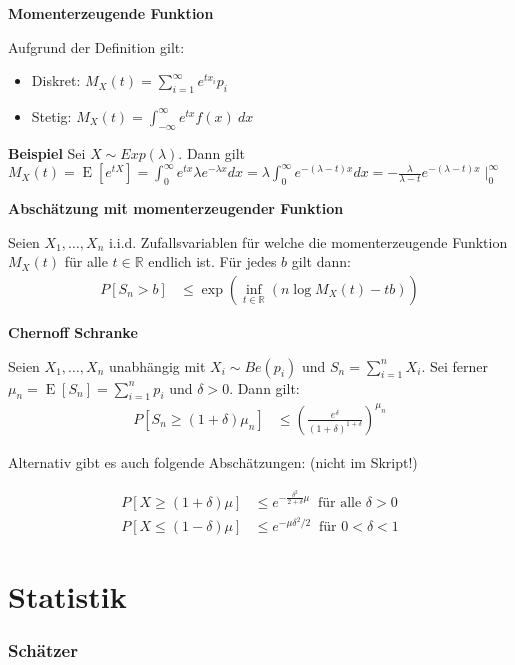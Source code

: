 \documentclass[25pt]{sciposter}
\newcommand{\R}{\mathbb{R}}
\newcommand{\E}{\operatorname{E}}
\newenvironment{method}[1]{\begin{mdframed}[backgroundcolor=blue!10,innertopmargin=15pt, innerbottommargin=15pt,nobreak=true]
		\textbf{#1 }
	}
	{ 
	\end{mdframed}
}
\begin{document}
\begin{multicols}{3}
\begin{method}{Momenterzeugende Funktion}
 Aufgrund der Definition gilt:\begin{itemize}
 	\item Diskret: $M_X(t) = \sum_{i=1}^{\infty} e^{tx_i}p_i$
 	\item Stetig: $M_X(t)= \int_{-\infty}^{\infty} e^{tx}f(x)\ dx$
 \end{itemize}
\end{method}

\textbf{Beispiel}
Sei $X \sim Exp(\lambda)$. Dann gilt $M_X(t) = \E[e^{tX}] = \int_{0}^{\infty} e^{tx} \lambda e^{-\lambda x} dx = \lambda \int_{0}^{\infty}e^{-(\lambda-t)x} dx = - \frac{\lambda}{\lambda - t} e^{-(\lambda -t)x}\mid_0^\infty$
\begin{method}{Abschätzung mit momenterzeugender Funktion}
Seien $X_1,\ldots,X_n$ i.i.d. Zufallsvariablen für welche die momenterzeugende Funktion $M_X(t)$ für alle $t\in \R$ endlich ist. Für jedes $b$ gilt dann:
\begin{align*}
	P[S_n > b] &\leq \exp \left( \inf_{t\in\R} \left(  n\log M_X(t) - tb \right)  \right)
\end{align*}
\end{method}


\begin{method}{Chernoff Schranke}
	Seien $X_1,\ldots,X_n$ unabhängig mit $X_i \sim Be(p_i)$ und $S_n = \sum_{i=1}^{n}X_i$. Sei ferner $\mu_n = \E[S_n] = \sum_{i=1}^{n} p_i$ und $\delta > 0$. Dann gilt:
	\begin{align*}
		P[S_n \geq (1+\delta)\mu_n] &\leq \left(\frac{e^\delta}{(1+\delta)^{1+\delta}}\right)^{\mu_n}
	\end{align*}
\end{method}

Alternativ gibt es auch folgende Abschätzungen: (nicht im Skript!)

\begin{align*}
	P[X \geq (1+\delta)\mu] &\leq e^{-\frac{\delta^2}{2+\delta}\mu} \ \text{ für alle } \delta > 0  \\
	P[X \leq (1-\delta)\mu] &\leq e^{-\mu\delta^2/2} \ \text{ für } 0 < \delta < 1
\end{align*}


\part{Statistik}

\section{Schätzer}

\end{multicols}
\end{document}

